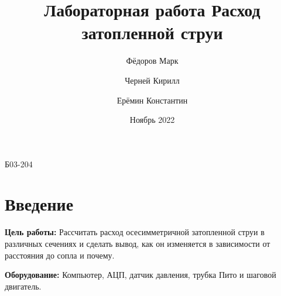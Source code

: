 

\title{Лабораторная работа \linebreak \textbf{Расход затопленной струи}}
\author{
    Фёдоров Марк\\
    \and
    Черней Кирилл\\
    \and
    Ерёмин Константин
}
\date{}


    \begin{titlepage}
        \maketitle
        \vspace{-1.5cm}
        \begin{center}
            {\Large Б03-204}\\
            \vspace{1cm}
            \date{Ноябрь 2022}
        \end{center}
    \end{titlepage}

    \section{Введение}
        \textbf{Цель работы:} Рассчитать расход осесимметричной затопленной струи в различных сечениях и сделать вывод, 
            как он изменяется в зависимости от расстояния до сопла и почему.
        
        \textbf{Оборудование:} Компьютер, АЦП, датчик давления, трубка Пито и шаговой двигатель.

